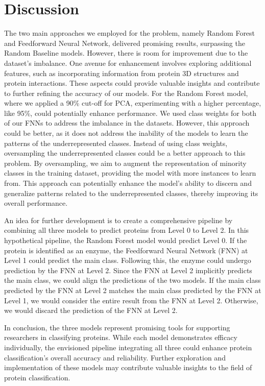 \documentclass{bioinfo}
\begin{document}
\section{Discussion}
The two main approaches we employed for the problem, namely Random Forest and Feedforward Neural Network, delivered promising results, surpassing the Random Baseline models.
However, there is room for improvement due to the dataset's imbalance.
One avenue for enhancement involves exploring additional features, such as incorporating information from protein 3D structures and protein interactions.
These aspects could provide valuable insights and contribute to further refining the accuracy of our models.
For the Random Forest model, where we applied a 90\% cut-off for PCA, experimenting with a higher percentage, 
like 95\%, could potentially enhance performance.
We used class weights for both of our FNNs to address the imbalance in the datasets.
However, this approach could be better, as it does not address the inability of the models to learn the patterns of the underrepresented classes.
Instead of using class weights, oversampling the underrepresented classes could be a better approach to this problem.
By oversampling, we aim to augment the representation of minority classes in the training dataset, 
providing the model with more instances to learn from. 
This approach can potentially enhance the model's ability to discern and generalize patterns related to the underrepresented 
classes, thereby improving its overall performance.

An idea for further development is to create a comprehensive pipeline by combining all three models to predict proteins from Level 0 to Level 2.
In this hypothetical pipeline, the Random Forest model would predict Level 0.
If the protein is identified as an enzyme, the Feedforward Neural Network (FNN) at Level 1 could predict the main class.
Following this, the enzyme could undergo prediction by the FNN at Level 2.
Since the FNN at Level 2 implicitly predicts the main class, we could align the predictions of the two models.
If the main class predicted by the FNN at Level 2 matches the main class predicted by the FNN at Level 1, 
we would consider the entire result from the FNN at Level 2.
Otherwise, we would discard the prediction of the FNN at Level 2.

In conclusion, the three models represent promising tools for supporting researchers in classifying proteins. 
While each model demonstrates efficacy individually, the envisioned pipeline integrating all three could enhance protein classification's overall accuracy and reliability.
Further exploration and implementation of these models may contribute valuable insights to the field of protein classification.
\end{document}
